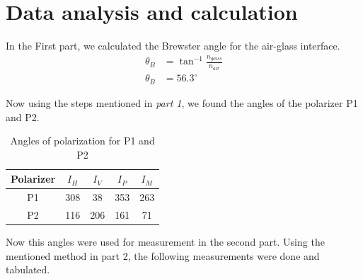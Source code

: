\section{Data analysis and calculation} 
In the First part, we calculated the Brewster angle for the air-glass interface. 
\begin{subequations}
    \begin{align}
        \theta_B &= \tan^{-1}\frac{n_{glass}}{n_{air}} \\
        \theta_{B} & = 56.3^\circ
    \end{align}
\end{subequations}

Now using the steps mentioned in \emph{part 1}, we found the angles of the polarizer P1 and P2. 

\begin{table}[H]
\centering

\begin{tabular}{|c| c| c| c| c|}
\toprule
Polarizer & $I_H$ & $I_V$ & $I_P$ & $I_M$ \\
\midrule
P1 & 308 & 38  & 353 & 263 \\ \hline
P2 & 116 & 206 & 161 & 71  \\
\bottomrule
\end{tabular}

\caption{Angles of polarization for P1 and P2}
\label{tab:polarization_P1_P2}
\end{table}
Now this angles were used for measurement in the second part. Using the mentioned method in part 2, the following measurements were done and tabulated.

